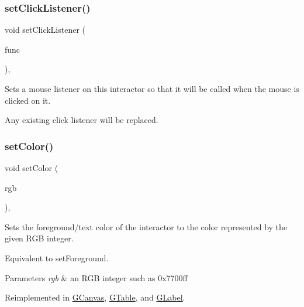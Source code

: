 \subsubsection{\texorpdfstring{set\+Click\+Listener()}{setClickListener()}\hspace{0.1cm}{\footnotesize\ttfamily [2/2]}}
{\footnotesize\ttfamily void set\+Click\+Listener (\begin{DoxyParamCaption}\item[{G\+Event\+Listener\+Void}]{func }\end{DoxyParamCaption})\hspace{0.3cm}{\ttfamily [virtual]}, {\ttfamily [inherited]}}



Sets a mouse listener on this interactor so that it will be called when the mouse is clicked on it. 

Any existing click listener will be replaced. \mbox{\label{classGInteractor_ab1f5cc0f5cc6bbbd716a526c61f1081d}} 
\subsubsection{\texorpdfstring{set\+Color()}{setColor()}\hspace{0.1cm}{\footnotesize\ttfamily [1/2]}}
{\footnotesize\ttfamily void set\+Color (\begin{DoxyParamCaption}\item[{int}]{rgb }\end{DoxyParamCaption})\hspace{0.3cm}{\ttfamily [virtual]}, {\ttfamily [inherited]}}



Sets the foreground/text color of the interactor to the color represented by the given R\+GB integer. 

Equivalent to set\+Foreground. 
\begin{DoxyParams}{Parameters}
{\em rgb} & an R\+GB integer such as 0x7700ff \\
\hline
\end{DoxyParams}


Reimplemented in \mbox{\hyperlink{classGCanvas_af6e1bcf23a09a0ae0607daff81ee45fa}{G\+Canvas}}, \mbox{\hyperlink{classGTable_a165735fb49fa7db12602d32557cbfe0d}{G\+Table}}, and \mbox{\hyperlink{classGLabel_a165735fb49fa7db12602d32557cbfe0d}{G\+Label}}.

